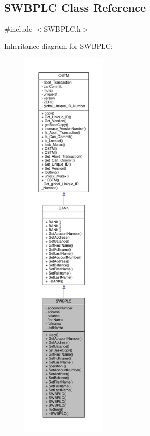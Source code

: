 \hypertarget{class_s_w_b_p_l_c}{}\subsection{S\+W\+B\+P\+LC Class Reference}
\label{class_s_w_b_p_l_c}


{\ttfamily \#include $<$S\+W\+B\+P\+L\+C.\+h$>$}



Inheritance diagram for S\+W\+B\+P\+LC\+:\nopagebreak
\begin{figure}[H]
\begin{center}
\leavevmode
\includegraphics[height=550pt]{class_s_w_b_p_l_c__inherit__graph}
\end{center}
\end{figure}


